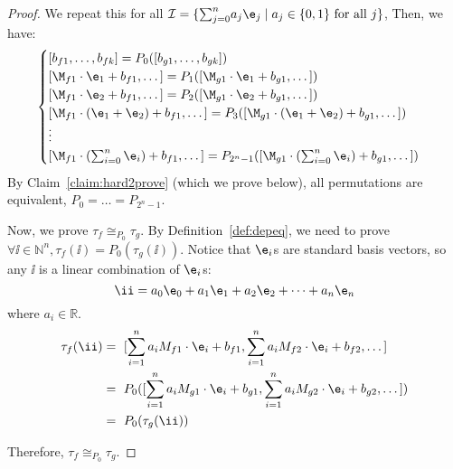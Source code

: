 \begin{proof}
    We repeat this for all $\mathcal{I} = \{\text{$\sum_{j=0}^n$} a_j \e_j \mid a_j \in \{0,1\} \text{ for all } j\}$,
    Then, we have:
    \begin{align*}
        \begin{cases}
            [b_{f1},\dots,b_{fk}] = P_0([b_{g1},\dots,b_{gk}])\\
            [\M_{f1}\cdot \e_1 + b_{f1},\dots] = P_1([\M_{g1}\cdot \e_1 + b_{g1}, \dots])\\
            [\M_{f1}\cdot \e_2 + b_{f1},\dots] = P_2([\M_{g1}\cdot \e_2 + b_{g1}, \dots])\\
            [\M_{f1}\cdot (\e_1+\e_2) + b_{f1},\dots] = P_3([\M_{g1}\cdot (\e_1+\e_2) + b_{g1}, \dots])\\
            \vdots\\
            [\M_{f1}\cdot (\sum_{i=0}^{n}\e_i) + b_{f1},\dots] = P_{2^n-1}([\M_{g1}\cdot (\sum_{i=0}^n\e_i) + b_{g1}, \dots])
        \end{cases}
    \end{align*}
    By Claim~\ref{claim:hard2prove} (which we prove below),
    all permutations are equivalent, $P_0=\dots=P_{2^n-1}$.

    Now, we prove $\tau_f \cong_{P_0} \tau_g$.
    By Definition~\ref{def:depeq},
    we need to prove $\forall \ii \in \mathbb{N}^n, \tau_f(\ii) = P_0(\tau_g(\ii))$.
    Notice that $\e_i$s are standard basis vectors,
    so any $\ii$ is a linear combination of $\e_i$s:
    \[
      \ii = a_0\e_0 + a_1\e_1 + a_2\e_2 + \dots + a_n\e_n
    \]
    where $a_i \in \mathbb{R}$.
    \begin{align*}
        \tau_f(\ii) &=\ [\sum_{i=1}^{n} a_iM_{f1}\cdot \e_i + b_{f1}, \sum_{i=1}^{n} a_iM_{f2}\cdot \e_i + b_{f2}, \dots  ] \\
        &=\ P_0([\sum_{i=1}^{n} a_iM_{g1}\cdot \e_i +b_{g1}, \sum_{i=1}^{n} a_iM_{g2}\cdot \e_i + b_{g2}, \dots]) \\
        &=\ P_0(\tau_g(\ii))
    \end{align*}

    Therefore, $\tau_f \cong_{P_0} \tau_g$.


\end{proof}


